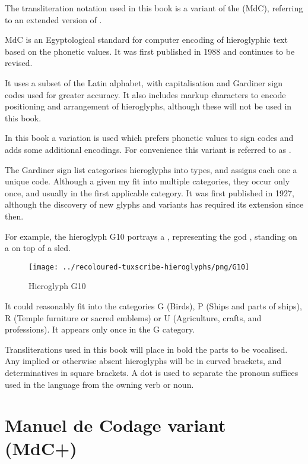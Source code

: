 The transliteration notation used in this book is a variant of the \textit{} (MdC), referring to an extended version of \textit{}.

MdC is an Egyptological standard for computer encoding of hieroglyphic text based on the phonetic values. It was first published in 1988 and continues to be revised.

It uses a subset of the Latin alphabet, with capitalisation and Gardiner sign codes used for greater accuracy. It also includes markup characters to encode positioning and arrangement of hieroglyphs, although these will not be used in this book.

In this book a variation is used which prefers phonetic values to sign codes and adds some additional encodings. For convenience this variant is referred to as .

The Gardiner sign list categorises hieroglyphs into types, and assigns each one a unique code. Although a given  my fit into multiple categories, they occur only once, and usually in the first applicable category. It was first published in 1927, although the discovery of new glyphs and variants has required its extension since then.

For example, the hieroglyph G10 portrays a , representing the god , standing on a  on top of a sled.

\begin{figure} [H]
\centering
\texttt{[image: ../recoloured-tuxscribe-hieroglyphs/png/G10]}
\caption{Hieroglyph G10}
\end{figure}

It could reasonably fit into the categories G (Birds), P (Ships and parts of ships), R (Temple furniture or sacred emblems) or U (Agriculture, crafts, and professions). It appears only once in the G category.

Transliterations used in this book will place in bold the parts to be vocalised. Any implied or otherwise absent hieroglyphs will be in curved brackets, and determinatives in square brackets. A dot is used to separate the pronoun suffices used in the language from the owning verb or noun.

\pagebreak

\section*{Manuel de Codage variant (MdC+)}

